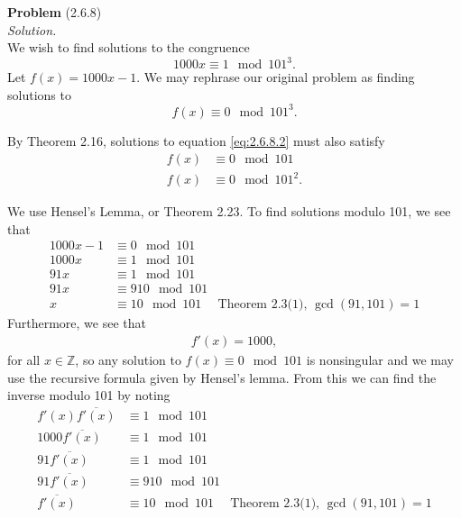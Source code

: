 \documentclass[12 pt]{amsart}
\begin{document}
\phantom{\quad} \vfill
\noindent
\textbf{Problem} (2.6.8) \\[4ex]
\emph{Solution.} \\[2ex]
  We wish to find solutions to the congruence
  \begin{equation}
    \label{eq:2.6.8.1}
    1000 x \equiv 1 \mod 101^3.
  \end{equation}
  Let $f(x) = 1000x - 1$.
  We may rephrase our original problem as finding solutions to
  \begin{equation}
    \label{eq:2.6.8.2}
    f(x) \equiv 0 \mod 101^3.
  \end{equation}

  By Theorem 2.16, solutions to equation \ref{eq:2.6.8.2} must also satisfy
  \begin{align*}
    f(x) &\equiv 0 \mod 101 \\
    f(x) &\equiv 0 \mod 101^2. 
  \end{align*}

  We use Hensel's Lemma, or Theorem 2.23.
  To find solutions modulo 101, we see that
  \begin{align*}
    1000x - 1 &\equiv 0 \mod 101 \\
    1000x  &\equiv 1 \mod 101 \\
    91x  &\equiv 1 \mod 101  \\
    91x  &\equiv 910 \mod 101  \\
    x &\equiv 10 \mod 101 & \text{Theorem 2.3(1), $\gcd(91, 101) = 1$} 
  \end{align*}
  Furthermore, we see that
  \begin{align*}
    f'(x) = 1000,
  \end{align*}
  for all $x \in \mathbb{Z}$, so any solution to $f(x) \equiv 0 \mod 101$
  is nonsingular and we may use the recursive formula given by Hensel's lemma.
  From this we can find the inverse modulo 101 by noting
  \begin{align*}
    f'(x) \overline{f'(x)} &\equiv 1 \mod 101 \\
    1000 \overline{f'(x)} &\equiv 1 \mod 101 \\
    91 \overline{f'(x)} &\equiv 1 \mod 101 \\
    91 \overline{f'(x)} &\equiv 910 \mod 101 \\
    \overline{f'(x)} &\equiv 10 \mod 101 & \text{Theorem 2.3(1), $\gcd(91, 101) = 1$}
  \end{align*}
\end{document}
